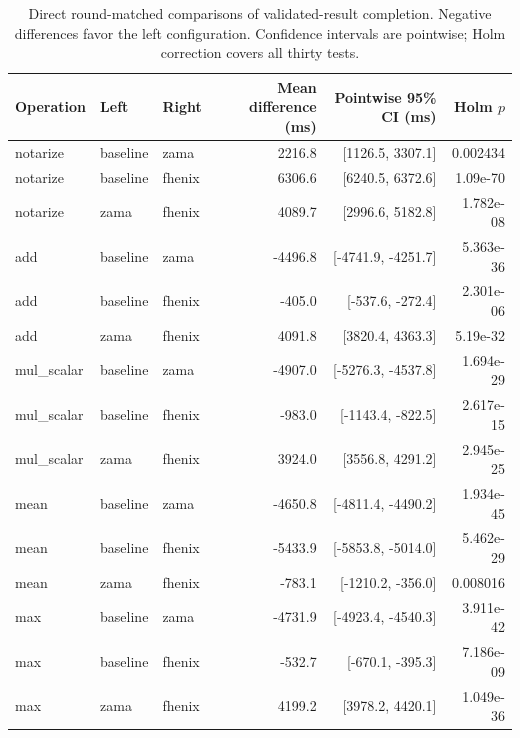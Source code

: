 \begin{table}[!t]
\centering\footnotesize
\caption{Direct round-matched comparisons of validated-result completion. Negative differences favor the left configuration. Confidence intervals are pointwise; Holm correction covers all thirty tests.}
\label{tab:lifecycle-comparisons-transactionToValidatedPlaintextMs}
\begin{tabular}{lllrrr}
\hline
Operation & Left & Right & Mean difference (ms) & Pointwise 95\% CI (ms) & Holm $p$ \\
\hline
notarize & baseline & zama & 2216.8 & [1126.5, 3307.1] & 0.002434 \\
notarize & baseline & fhenix & 6306.6 & [6240.5, 6372.6] & 1.09e-70 \\
notarize & zama & fhenix & 4089.7 & [2996.6, 5182.8] & 1.782e-08 \\
add & baseline & zama & -4496.8 & [-4741.9, -4251.7] & 5.363e-36 \\
add & baseline & fhenix & -405.0 & [-537.6, -272.4] & 2.301e-06 \\
add & zama & fhenix & 4091.8 & [3820.4, 4363.3] & 5.19e-32 \\
mul\_scalar & baseline & zama & -4907.0 & [-5276.3, -4537.8] & 1.694e-29 \\
mul\_scalar & baseline & fhenix & -983.0 & [-1143.4, -822.5] & 2.617e-15 \\
mul\_scalar & zama & fhenix & 3924.0 & [3556.8, 4291.2] & 2.945e-25 \\
mean & baseline & zama & -4650.8 & [-4811.4, -4490.2] & 1.934e-45 \\
mean & baseline & fhenix & -5433.9 & [-5853.8, -5014.0] & 5.462e-29 \\
mean & zama & fhenix & -783.1 & [-1210.2, -356.0] & 0.008016 \\
max & baseline & zama & -4731.9 & [-4923.4, -4540.3] & 3.911e-42 \\
max & baseline & fhenix & -532.7 & [-670.1, -395.3] & 7.186e-09 \\
max & zama & fhenix & 4199.2 & [3978.2, 4420.1] & 1.049e-36 \\
\hline
\end{tabular}
\end{table}

